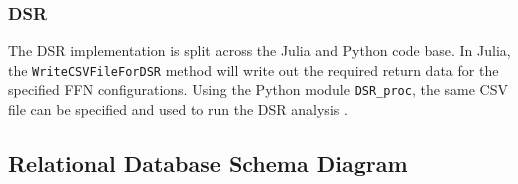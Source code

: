 \documentclass[a4paper,11pt,oneside]{article}
\theoremstyle{plain}
\theoremstyle{definition}
\begin{document}
	\subsubsection{DSR}
	
	The DSR implementation is split across the Julia and Python code base. In Julia, the \texttt{WriteCSVFileForDSR} method will write out the required return data for the specified FFN configurations. Using the Python module \texttt{DSR\_proc}, the same CSV file can be specified and used to run the DSR analysis \citep{DCDSR_Dataproc}.

	\newpage	
	\subsection{Relational Database Schema Diagram}\label{appendix_database_schema}
	
\end{document}

